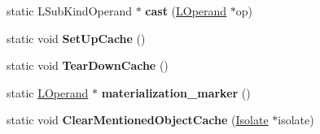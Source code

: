 \begin{DoxyCompactItemize}
\item 
\hypertarget{classv8_1_1internal_1_1_v8___f_i_n_a_l_a588295d1e4068fdf4ac681f95b0c0c47}{}static L\+Sub\+Kind\+Operand $\ast$ {\bfseries cast} (\hyperlink{classv8_1_1internal_1_1_l_operand}{L\+Operand} $\ast$op)\label{classv8_1_1internal_1_1_v8___f_i_n_a_l_a588295d1e4068fdf4ac681f95b0c0c47}

\item 
\hypertarget{classv8_1_1internal_1_1_v8___f_i_n_a_l_a67f8fd8162fbaddb0803fbace9ba4a65}{}static void {\bfseries Set\+Up\+Cache} ()\label{classv8_1_1internal_1_1_v8___f_i_n_a_l_a67f8fd8162fbaddb0803fbace9ba4a65}

\item 
\hypertarget{classv8_1_1internal_1_1_v8___f_i_n_a_l_abb676a1031462f9ee872c8612e8dec43}{}static void {\bfseries Tear\+Down\+Cache} ()\label{classv8_1_1internal_1_1_v8___f_i_n_a_l_abb676a1031462f9ee872c8612e8dec43}

\item 
\hypertarget{classv8_1_1internal_1_1_v8___f_i_n_a_l_a085e475d21865b3c086033cb90be78ab}{}static \hyperlink{classv8_1_1internal_1_1_l_operand}{L\+Operand} $\ast$ {\bfseries materialization\+\_\+marker} ()\label{classv8_1_1internal_1_1_v8___f_i_n_a_l_a085e475d21865b3c086033cb90be78ab}

\item 
\hypertarget{classv8_1_1internal_1_1_v8___f_i_n_a_l_aa4ed5cd04a8d0a378784a4b3dc10415c}{}static void {\bfseries Clear\+Mentioned\+Object\+Cache} (\hyperlink{classv8_1_1internal_1_1_isolate}{Isolate} $\ast$isolate)\label{classv8_1_1internal_1_1_v8___f_i_n_a_l_aa4ed5cd04a8d0a378784a4b3dc10415c}

\end{DoxyCompactItemize}
